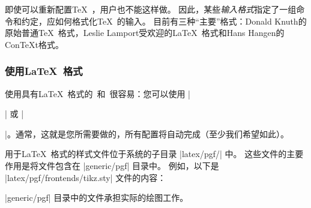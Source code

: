 即使可以重新配置\TeX\ ，用户也不能这样做。 因此，某些\emph{输入格式}指定了一组命令和约定，应如何格式化\TeX\ 的输入。 目前有三种``主要''格式：Donald Knuth的原始普通\TeX\ 格式，Leslie Lamport受欢迎的\LaTeX\ 格式和Hans Hangen的Con\TeX t格式。


\subsubsection{使用\LaTeX\ 格式}


使用具有\LaTeX\ 格式的\pgfname\ 和\tikzname\ 很容易：您可以使用 |\usepackage{pgf}| 或 |\usepackage{tikz}|。通常，这就是您所需要做的，所有配置将自动完成（至少我们希望如此）。


用于\LaTeX\ 格式的样式文件位于\pgfname 系统的子目录 |latex/pgf/| 中。 这些文件的主要作用是将文件包含在 |generic/pgf| 目录中。 例如，以下是 |latex/pgf/frontends/tikz.sty| 文件的内容： 
%


|generic/pgf| 目录中的文件承担实际的绘图工作。



